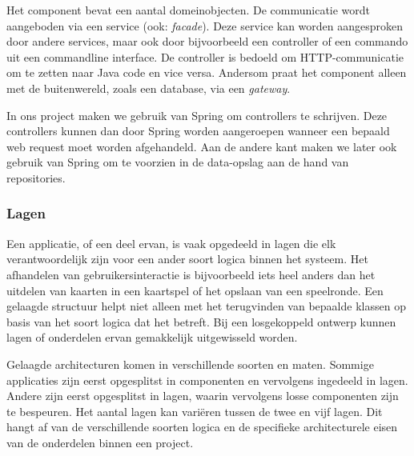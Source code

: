 Het component bevat een aantal domeinobjecten. 
De communicatie wordt aangeboden via een service (ook: \textit{facade}). 
Deze service kan worden aangesproken door andere
services, maar ook door bijvoorbeeld een controller of een commando uit een commandline interface. 
De controller is bedoeld om HTTP-communicatie om te zetten naar Java code en vice versa. 
Andersom praat het component alleen met de buitenwereld, zoals een database, via een \textit{gateway}.

In ons project maken we gebruik van Spring om controllers te schrijven.
Deze controllers kunnen dan door Spring worden aangeroepen 
wanneer een bepaald web request moet worden afgehandeld.
Aan de andere kant maken we later ook gebruik van Spring om te voorzien in 
de data-opslag aan de hand van repositories.

\subsubsection{Lagen}
Een applicatie, of een deel ervan, is vaak opgedeeld in lagen die 
elk verantwoordelijk zijn voor een ander soort logica binnen het systeem.
Het afhandelen van gebruikersinteractie 
is bijvoorbeeld iets heel anders dan het uitdelen van kaarten in een
kaartspel of het opslaan van een speelronde.
Een gelaagde structuur helpt niet alleen met het terugvinden van
bepaalde klassen op basis van het soort logica dat het betreft. Bij een 
losgekoppeld ontwerp kunnen lagen of onderdelen ervan gemakkelijk uitgewisseld worden.

Gelaagde architecturen komen in verschillende soorten en maten. Sommige applicaties 
zijn eerst opgesplitst in componenten en vervolgens ingedeeld in lagen. Andere zijn 
eerst opgesplitst in lagen, waarin vervolgens losse componenten zijn te bespeuren.
Het aantal lagen kan variëren tussen de twee en vijf lagen. Dit hangt af 
van de verschillende soorten logica en de specifieke architecturele eisen
van de onderdelen binnen een project.


